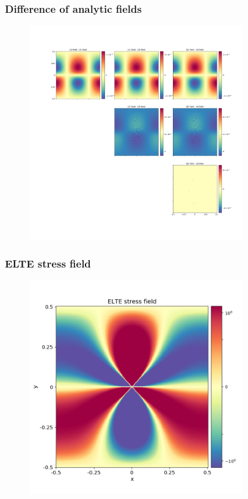 \documentclass{beamer}
\begin{document}
\begin{frame}
    \frametitle{Difference of analytic fields}
    
    \begin{figure}[H]
        \centering
        \includegraphics[width=0.825\textwidth]{../difference_of_analytic_fields.png}
    \end{figure}

\end{frame}


\begin{frame}
    \frametitle{ELTE stress field}
    
    \begin{figure}[H]
        \centering
        \includegraphics[width=0.825\textwidth]{../elte_stress_field.png}
    \end{figure}

\end{frame}
\end{document}
